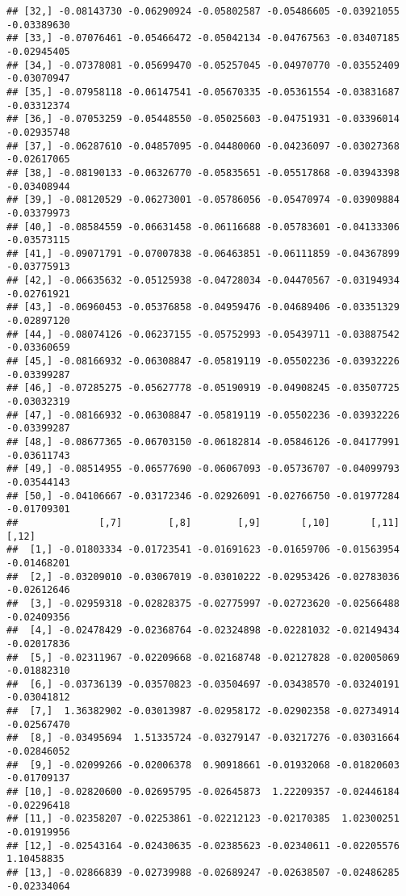 \documentclass[
]{article}
\begin{document}
\begin{verbatim}
## [32,] -0.08143730 -0.06290924 -0.05802587 -0.05486605 -0.03921055 -0.03389630
## [33,] -0.07076461 -0.05466472 -0.05042134 -0.04767563 -0.03407185 -0.02945405
## [34,] -0.07378081 -0.05699470 -0.05257045 -0.04970770 -0.03552409 -0.03070947
## [35,] -0.07958118 -0.06147541 -0.05670335 -0.05361554 -0.03831687 -0.03312374
## [36,] -0.07053259 -0.05448550 -0.05025603 -0.04751931 -0.03396014 -0.02935748
## [37,] -0.06287610 -0.04857095 -0.04480060 -0.04236097 -0.03027368 -0.02617065
## [38,] -0.08190133 -0.06326770 -0.05835651 -0.05517868 -0.03943398 -0.03408944
## [39,] -0.08120529 -0.06273001 -0.05786056 -0.05470974 -0.03909884 -0.03379973
## [40,] -0.08584559 -0.06631458 -0.06116688 -0.05783601 -0.04133306 -0.03573115
## [41,] -0.09071791 -0.07007838 -0.06463851 -0.06111859 -0.04367899 -0.03775913
## [42,] -0.06635632 -0.05125938 -0.04728034 -0.04470567 -0.03194934 -0.02761921
## [43,] -0.06960453 -0.05376858 -0.04959476 -0.04689406 -0.03351329 -0.02897120
## [44,] -0.08074126 -0.06237155 -0.05752993 -0.05439711 -0.03887542 -0.03360659
## [45,] -0.08166932 -0.06308847 -0.05819119 -0.05502236 -0.03932226 -0.03399287
## [46,] -0.07285275 -0.05627778 -0.05190919 -0.04908245 -0.03507725 -0.03032319
## [47,] -0.08166932 -0.06308847 -0.05819119 -0.05502236 -0.03932226 -0.03399287
## [48,] -0.08677365 -0.06703150 -0.06182814 -0.05846126 -0.04177991 -0.03611743
## [49,] -0.08514955 -0.06577690 -0.06067093 -0.05736707 -0.04099793 -0.03544143
## [50,] -0.04106667 -0.03172346 -0.02926091 -0.02766750 -0.01977284 -0.01709301
##              [,7]        [,8]        [,9]       [,10]       [,11]       [,12]
##  [1,] -0.01803334 -0.01723541 -0.01691623 -0.01659706 -0.01563954 -0.01468201
##  [2,] -0.03209010 -0.03067019 -0.03010222 -0.02953426 -0.02783036 -0.02612646
##  [3,] -0.02959318 -0.02828375 -0.02775997 -0.02723620 -0.02566488 -0.02409356
##  [4,] -0.02478429 -0.02368764 -0.02324898 -0.02281032 -0.02149434 -0.02017836
##  [5,] -0.02311967 -0.02209668 -0.02168748 -0.02127828 -0.02005069 -0.01882310
##  [6,] -0.03736139 -0.03570823 -0.03504697 -0.03438570 -0.03240191 -0.03041812
##  [7,]  1.36382902 -0.03013987 -0.02958172 -0.02902358 -0.02734914 -0.02567470
##  [8,] -0.03495694  1.51335724 -0.03279147 -0.03217276 -0.03031664 -0.02846052
##  [9,] -0.02099266 -0.02006378  0.90918661 -0.01932068 -0.01820603 -0.01709137
## [10,] -0.02820600 -0.02695795 -0.02645873  1.22209357 -0.02446184 -0.02296418
## [11,] -0.02358207 -0.02253861 -0.02212123 -0.02170385  1.02300251 -0.01919956
## [12,] -0.02543164 -0.02430635 -0.02385623 -0.02340611 -0.02205576  1.10458835
## [13,] -0.02866839 -0.02739988 -0.02689247 -0.02638507 -0.02486285 -0.02334064

\end{verbatim}
\end{document}
